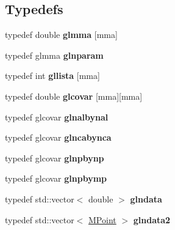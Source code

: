 \subsection*{Typedefs}
\begin{DoxyCompactItemize}
\item 
\hypertarget{namespaceope_aaa82c1f08a80fa2e3727b273aac45404}{typedef double {\bfseries glmma} \mbox{[}mma\mbox{]}}\label{namespaceope_aaa82c1f08a80fa2e3727b273aac45404}

\item 
\hypertarget{namespaceope_aba2d1518d2ad25f7c7cfafaa8897c58d}{typedef glmma {\bfseries glnparam}}\label{namespaceope_aba2d1518d2ad25f7c7cfafaa8897c58d}

\item 
\hypertarget{namespaceope_a44adc8ee9bbf2c365579025040aa9488}{typedef int {\bfseries gllista} \mbox{[}mma\mbox{]}}\label{namespaceope_a44adc8ee9bbf2c365579025040aa9488}

\item 
\hypertarget{namespaceope_a665dbc282e3686546e1a290f67059038}{typedef double {\bfseries glcovar} \mbox{[}mma\mbox{]}\mbox{[}mma\mbox{]}}\label{namespaceope_a665dbc282e3686546e1a290f67059038}

\item 
\hypertarget{namespaceope_a18a3eb95ce3436ca30f72bae69d03882}{typedef glcovar {\bfseries glnalbynal}}\label{namespaceope_a18a3eb95ce3436ca30f72bae69d03882}

\item 
\hypertarget{namespaceope_a997abc9c2d243dafcc0ecf82792b41a0}{typedef glcovar {\bfseries glncabynca}}\label{namespaceope_a997abc9c2d243dafcc0ecf82792b41a0}

\item 
\hypertarget{namespaceope_ab9df7c0fd9b55c15b6a1cfb78a93298c}{typedef glcovar {\bfseries glnpbynp}}\label{namespaceope_ab9df7c0fd9b55c15b6a1cfb78a93298c}

\item 
\hypertarget{namespaceope_a2529f6f2f2616fe5fc7249242686542d}{typedef glcovar {\bfseries glnpbymp}}\label{namespaceope_a2529f6f2f2616fe5fc7249242686542d}

\item 
\hypertarget{namespaceope_a3b23cb9236a52fd2f3f272d66d0c9c0b}{typedef std\-::vector$<$ double $>$ {\bfseries glndata}}\label{namespaceope_a3b23cb9236a52fd2f3f272d66d0c9c0b}

\item 
\hypertarget{namespaceope_a80599c3cad5832a4cd51f5f2b5eaf28a}{typedef std\-::vector$<$ \hyperlink{classope_1_1_m_point}{M\-Point} $>$ {\bfseries glndata2}}\label{namespaceope_a80599c3cad5832a4cd51f5f2b5eaf28a}


\end{DoxyCompactItemize}
